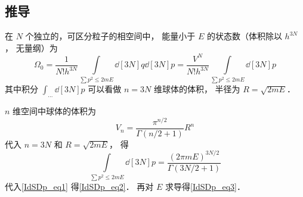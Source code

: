 \subsection{推导}
在 $N$ 个独立的，可区分粒子的相空间中， 能量小于 $E$ 的状态数（体积除以 $h^{3N}$， 无量纲）为
\begin{equation}\label{IdSDp_eq1}
\Omega_0 = \frac{1}{N! h^{3N}} \int\limits_{\sum p^2 \leqslant 2mE} \dd[3N]{q} \dd[3N]{p} = \frac{V^N}{N! h^{3N}} \int\limits_{\sum p^2 \leqslant 2mE} \dd[3N]{p}
\end{equation}
其中积分 $\int_{\dots} \dd[3N]{p} $ 可以看做 $n=3N$ 维球体的体积， 半径为 $R = \sqrt{2mE}$． 

$n$ 维空间中球体的体积为
\begin{equation}
V_n = \frac{\pi^{n/2}}{\Gamma(n/2+1)}R^n
\end{equation}
代入 $n=3N$ 和 $R = \sqrt{2mE} $， 得
\begin{equation}
\int\limits_{\sum p^2 \leqslant 2mE} \dd[3N]{p} = \frac{(2\pi mE)^{3N/2}}{\Gamma(3N/2+1)}
\end{equation}
代入\autoref{IdSDp_eq1} 得\autoref{IdSDp_eq2}． 再对 $E$ 求导得\autoref{IdSDp_eq3}．
